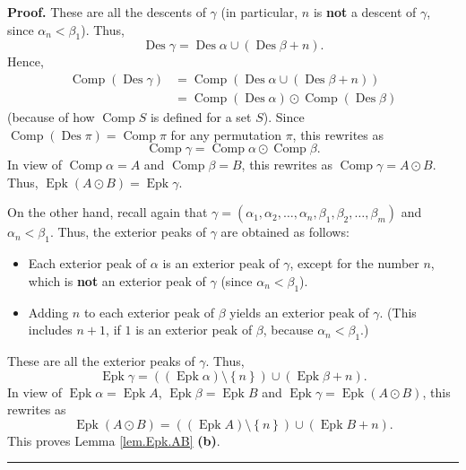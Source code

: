 \documentclass[numbers=enddot,12pt,final,onecolumn,notitlepage]{scrartcl}%
\theoremstyle{definition}
\newenvironment{proof}[1][Proof]{\noindent\textbf{#1.} }{\ \rule{0.5em}{0.5em}}
\newenvironment{verlong}{}{}
\begin{document}
\begin{verlong}
\begin{proof}
These are all the descents of $\gamma$ (in particular, $n$ is \textbf{not} a
descent of $\gamma$, since $\alpha_{n}<\beta_{1}$). Thus,%
\[
\operatorname*{Des}\gamma=\operatorname*{Des}\alpha\cup\left(
\operatorname*{Des}\beta+n\right)  .
\]
Hence,%
\begin{align*}
\operatorname*{Comp}\left(  \operatorname*{Des}\gamma\right)   &
=\operatorname*{Comp}\left(  \operatorname*{Des}\alpha\cup\left(
\operatorname*{Des}\beta+n\right)  \right) \\
&  =\operatorname*{Comp}\left(  \operatorname*{Des}\alpha\right)
\odot\operatorname*{Comp}\left(  \operatorname*{Des}\beta\right)
\end{align*}
(because of how $\operatorname*{Comp}S$ is defined for a set $S$). Since
$\operatorname*{Comp}\left(  \operatorname*{Des}\pi\right)
=\operatorname*{Comp}\pi$ for any permutation $\pi$, this rewrites as%
\[
\operatorname*{Comp}\gamma=\operatorname*{Comp}\alpha\odot\operatorname*{Comp}%
\beta.
\]
In view of $\operatorname*{Comp}\alpha=A$ and $\operatorname*{Comp}\beta=B$,
this rewrites as $\operatorname*{Comp}\gamma=A\odot B$. Thus,
$\operatorname*{Epk}\left(  A\odot B\right)  =\operatorname*{Epk}\gamma$.

On the other hand, recall again that $\gamma=\left(  \alpha_{1},\alpha
_{2},\ldots,\alpha_{n},\beta_{1},\beta_{2},\ldots,\beta_{m}\right)  $ and
$\alpha_{n}<\beta_{1}$. Thus, the exterior peaks of $\gamma$ are obtained as follows:

\begin{itemize}
\item Each exterior peak of $\alpha$ is an exterior peak of $\gamma$, except
for the number $n$, which is \textbf{not} an exterior peak of $\gamma$ (since
$\alpha_{n}<\beta_{1}$).

\item Adding $n$ to each exterior peak of $\beta$ yields an exterior peak of
$\gamma$. (This includes $n+1$, if $1$ is an exterior peak of $\beta$, because
$\alpha_{n}<\beta_{1}$.)
\end{itemize}

These are all the exterior peaks of $\gamma$. Thus,%
\[
\operatorname*{Epk}\gamma=\left(  \left(  \operatorname*{Epk}\alpha\right)
\setminus\left\{  n\right\}  \right)  \cup\left(  \operatorname*{Epk}%
\beta+n\right)  .
\]
In view of $\operatorname*{Epk}\alpha=\operatorname*{Epk}A$,
$\operatorname*{Epk}\beta=\operatorname*{Epk}B$ and $\operatorname*{Epk}%
\gamma=\operatorname*{Epk}\left(  A\odot B\right)  $, this rewrites as
\[
\operatorname*{Epk}\left(  A\odot B\right)  =\left(  \left(
\operatorname*{Epk}A\right)  \setminus\left\{  n\right\}  \right)  \cup\left(
\operatorname*{Epk}B+n\right)  .
\]
This proves Lemma \ref{lem.Epk.AB} \textbf{(b)}.
\end{proof}


\end{verlong}
\end{document}

